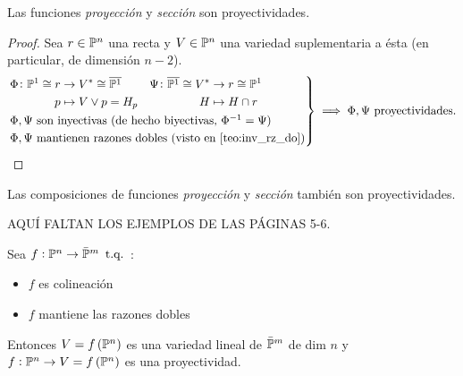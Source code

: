 \begin{col}
  Las funciones \textit{proyección} y \textit{sección} son proyectividades.
\end{col}
\begin{proof}
  Sea $r \in \mathbb{P}^n$ una recta y $V \in \mathbb{P}^n$ una variedad suplementaria a ésta
  (en particular, de dimensión $n-2$).
  \[
    \begin{rcases}
      \begin{aligned}
      \Phi \colon \mathbb{P}^1 \cong r &\to V^\ast \cong \overline{\mathbb{P}^1} \\
      p &\mapsto V \vee p = H_p
      \end{aligned}
      \quad
      \begin{aligned}
      \Psi \colon \overline{\mathbb{P}^1} \cong V^* &\to r \cong \mathbb{P}^1 \\ H &\mapsto H \cap r
      \end{aligned} \\
      \Phi, \Psi \text{ son inyectivas (de hecho biyectivas, } \Phi^{-1} = \Psi
      \text{)}\\
      \Phi, \Psi \text{ mantienen razones dobles (visto en \ref{teo:inv_rz_do})}
  \end{rcases}
  \implies
  \Phi, \Psi \text{ proyectividades.}
 \]
\end{proof}
\begin{obs}
  Las composiciones de funciones \textit{proyección} y \textit{sección} también son proyectividades.
\end{obs}
\begin{example}
    AQUÍ FALTAN LOS EJEMPLOS DE LAS PÁGINAS 5-6.
\end{example}
\begin{prop} \label{prop:demo_teo2}
    Sea $f : \mathbb{P}^n \to \bar{\mathbb{P}}^m \operatorname{\text{ t.q. }}$:
    \begin{itemize}
        \item $f$ es colineación
        \item $f$ mantiene las razones dobles
    \end{itemize}
    Entonces $V = f \left( \mathbb{P}^n \right)$ es una variedad lineal de $\bar{\mathbb{P}}^m$ de dim $n$ y $f : \mathbb{P}^n \to V = f \left( \mathbb{P}^n \right)$ es una proyectividad.
\end{prop}

